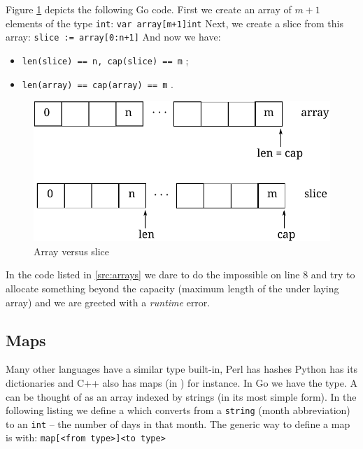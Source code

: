 Figure \ref{fig:array-vs-slice} depicts the following Go code.
First we create an array of $m + 1$ elements of the type \lstinline{int}:
\lstinline{var array[m+1]int}\newline
Next, we create a slice from this array:
\lstinline{slice := array[0:n+1]}\newline
And now we have:
\begin{itemize}
\item{\lstinline{len(slice) == n, cap(slice) == m}{} ;}
\item{\lstinline{len(array) == cap(array) == m}{} .}
\end{itemize}
\begin{figure}[H]
\caption{Array versus slice}
\label{fig:array-vs-slice}
\begin{center}
\includegraphics[scale=0.65]{fig/array-vs-slice.pdf}
\end{center}
\end{figure}

In the code listed in \ref{src:arrays} we dare to do the impossible on
line 8 and try to allocate something
beyond the capacity (maximum length of the under laying array) and
we are greeted with a \emph{runtime} error.


\subsection{Maps}
\label{sec:maps}
Many other languages have a similar type built-in, Perl has hashes
Python has its dictionaries and C++ also has maps (in
) for instance. 
In Go we have the
 type. A  can be thought of as an array indexed by
strings (in its most simple form).
In the following listing we define a  which converts from a
\lstinline{string} (month abbreviation) to an \lstinline{int} -- the number of days in that month. 
The generic way to define a map is with: \verb|map[<from type>]<to type>|

